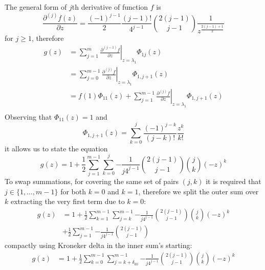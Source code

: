 The general form of $j$th derivative of function $f$ is 
$$\frac{\partial^{(j)}{f}(z)}{\partial{z}} =\frac{(-1)^{j-1}}{2}\frac{(j-1)!}{4^{j-1}}{{2(j-1)}\choose{j-1}}\frac{1}{z^{\frac{2(j-1)+1}{2}}} $$ 
for $j \geq 1$, therefore
\begin{displaymath}
\begin{split}
  g(z) &= \sum_{j=1}^{m}{ \left. \frac{\partial^{(j-1)}{f}}{\partial{z}} \right|_{z=\lambda_{1}}\Phi_{1j}(z)} \\
       &= \sum_{j=0}^{m-1}{ \left. \frac{\partial^{(j)}{f}}{\partial{z}} \right|_{z=\lambda_{1}}\Phi_{1,j+1}(z)} \\
       &= f(1)\Phi_{11}(z) + \sum_{j=1}^{m-1}{ \left. \frac{\partial^{(j)}{f}}{\partial{z}} \right|_{z=\lambda_{1}}\Phi_{1,j+1}(z)} \\
\end{split}
\end{displaymath}
Observing that $\Phi_{11}(z)=1$ and
\begin{displaymath}
  \Phi_{1,j+1}(z) = \sum_{k=0}^{j}{\frac{(-1)^{j-k}}{(j-k)!}\frac{z^{k}}{k!}}
\end{displaymath}
it allows us to state the equation
\begin{equation}
  g(z) = 1 +\frac{1}{2} \sum_{j=1}^{m-1}{\sum_{k=0}^{j}{-\frac{1}{j 4^{j-1}} {{2(j-1)}\choose{j-1}}{{j}\choose{k}} (-z)^{k}}}
\end{equation}
To swap summations, for covering the same set of pairs $(j, k)$ it is required that 
$j\in \lbrace 1, \ldots, m-1 \rbrace$ for both $k=0$ and $k=1$, therefore we split
the outer sum over $k$ extracting the very first term due to $k=0$:
\begin{equation}
\begin{split}
  g(z) &= 1 +\frac{1}{2} \sum_{k=1}^{m-1}{\sum_{j=k}^{m-1}{-\frac{1}{j 4^{j-1}} {{2(j-1)}\choose{j-1}}{{j}\choose{k}} (-z)^{k}}} \\
       &+ \frac{1}{2}\sum_{j=1}^{m-1}{-\frac{1}{j 4^{j-1}} {{2(j-1)}\choose{j-1}}}
\end{split}
\end{equation}
compactly using Kroneker delta in the inner sum's starting:
\begin{equation}
\begin{split}
  g(z) &= 1 +\frac{1}{2} \sum_{k=0}^{m-1}{\sum_{j=k+\delta_{k0}}^{m-1}{-\frac{1}{j 4^{j-1}} {{2(j-1)}\choose{j-1}}{{j}\choose{k}} (-z)^{k}}} \\
\end{split}
\end{equation}


